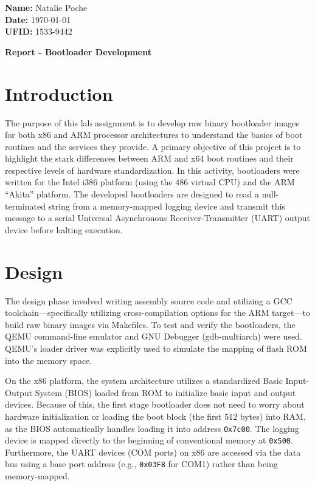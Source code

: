 \documentclass{article}
\begin{document}
\noindent \textbf{Name:} Natalie Poche \\
\textbf{Date:} \today \\ %
\textbf{UFID:} 1533-9442

\begin{center} %
    \large\textbf{Report - Bootloader Development}
\end{center}

\section{Introduction}
The purpose of this lab assignment is to develop raw binary bootloader images for both x86 and ARM processor architectures to understand the basics of boot routines and the services they provide. A primary objective of this project is to highlight the stark differences between ARM and x64 boot routines and their respective levels of hardware standardization. In this activity, bootloaders were written for the Intel i386 platform (using the 486 virtual CPU) and the ARM ``Akita'' platform. The developed bootloaders are designed to read a null-terminated string from a memory-mapped logging device and transmit this message to a serial Universal Asynchronous Receiver-Transmitter (UART) output device before halting execution. 

\section{Design}
The design phase involved writing assembly source code and utilizing a GCC toolchain—specifically utilizing cross-compilation options for the ARM target—to build raw binary images via Makefiles. To test and verify the bootloaders, the QEMU command-line emulator and GNU Debugger (gdb-multiarch) were used. QEMU's loader driver was explicitly used to simulate the mapping of flash ROM into the memory space.

On the x86 platform, the system architecture utilizes a standardized Basic Input-Output System (BIOS) loaded from ROM to initialize basic input and output devices. Because of this, the first stage bootloader does not need to worry about hardware initialization or loading the boot block (the first 512 bytes) into RAM, as the BIOS automatically handles loading it into address \texttt{0x7c00}. The logging device is mapped directly to the beginning of conventional memory at \texttt{0x500}. Furthermore, the UART devices (COM ports) on x86 are accessed via the data bus using a base port address (e.g., \texttt{0x03F8} for COM1) rather than being memory-mapped.
\end{document}
